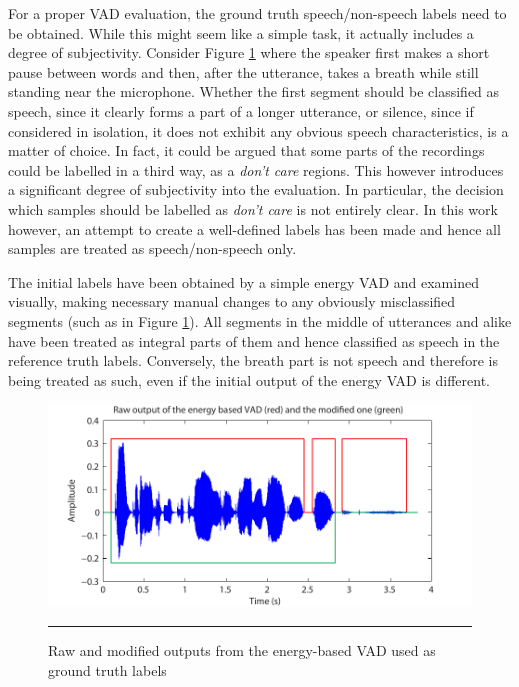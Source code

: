 For a proper VAD evaluation, the ground truth speech/non-speech labels need to be obtained. While this might seem like a simple task, it actually includes a degree of subjectivity. Consider Figure \ref{fig:groundtruth} where the speaker first makes a short pause between words and then, after the utterance, takes a breath while still standing near the microphone. Whether the first segment should be classified as speech, since it clearly forms a part of a longer utterance, or silence, since if considered in isolation, it does not exhibit any obvious speech characteristics, is a matter of choice. In fact, it could be argued that some parts of the recordings could be labelled in a third way, as a \emph{don't care} regions. This however introduces a significant degree of subjectivity into the evaluation. In particular, the decision which samples should be labelled as \emph{don't care} is not entirely clear. In this work however, an attempt to create a well-defined labels has been made and hence all samples are treated as speech/non-speech only.

The initial labels have been obtained by a simple energy VAD and examined visually, making necessary manual changes to any obviously misclassified segments (such as in Figure \ref{fig:groundtruth}). All segments in the middle of utterances and alike have been treated as integral parts of them and hence classified as speech in the reference truth labels. Conversely, the breath part is not speech and therefore is being treated as such, even if the initial output of the energy VAD is different.

\begin{figure}[htbp]
	\centering
		\includegraphics[width=1.0\columnwidth]{Figures/Chapter3/groundtruthbold.pdf}
		\rule{37em}{0.5pt}
	\caption[Raw and modified outputs from the energy-based VAD used as ground truth labels]{Raw and modified outputs from the energy-based VAD used as ground truth labels}
	\label{fig:groundtruth}
\end{figure}


